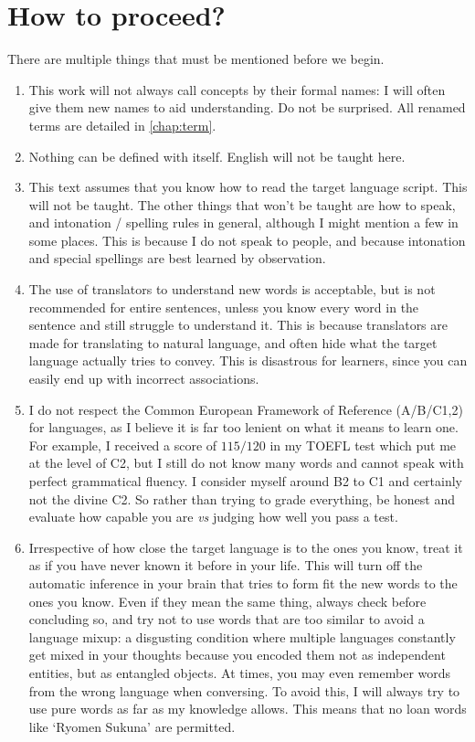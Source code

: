 \chapter{How to proceed?} 
There are multiple things that must be mentioned before we begin.
\begin{enumerate}
    \item This work will not always call concepts by their formal names: I will often give them new names to aid understanding. Do not be surprised. All renamed terms are detailed in \autoref{chap:term}.
    \item Nothing can be defined with itself. English will not be taught here.
    \item This text assumes that you know how to read the target language script. This will not be taught. The other things that won't be taught are how to speak, and intonation / spelling rules in general, although I might mention a few in some places. This is because I do not speak to people, and because intonation and special spellings are best learned by observation.
    \item The use of translators to understand new words is acceptable, but is not recommended  for entire sentences, unless you know every word in the sentence and still struggle to understand it. This is because translators are made for translating to natural language, and often hide what the target language actually tries to convey. This is disastrous for learners, since you can easily end up with incorrect associations.
    \item I do not respect the Common European Framework of Reference (A/B/C1,2) for languages, as I believe it is far too lenient on what it means to learn one. For example, I received a score of $115/120$ in my TOEFL test which put me at the level of C2, but I still do not know many words and cannot speak with perfect grammatical fluency. I consider myself around B2 to C1 and certainly not the divine C2. So rather than trying to grade everything, be honest and evaluate how capable you are \textit{vs} judging how well you pass a test.
    \item Irrespective of how close the target language is to the ones you know, treat it as if you have never known it before in your life. This will turn off the automatic inference in your brain that tries to form fit the new words to the ones you know. Even if they mean the same thing, always check before concluding so, and try not to use words that are too similar to avoid a language mixup: a disgusting condition where multiple languages constantly get mixed in your thoughts because you encoded them not as independent entities, but as entangled objects. At times, you may even remember words from the wrong language when conversing. To avoid this, I will always try to use pure words as far as my knowledge allows. This means that no loan words like `Ryomen Sukuna' are permitted.

\end{enumerate}
